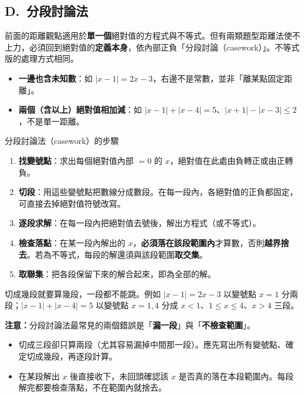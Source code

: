 \documentclass[11pt]{article}
\begin{document}
\subsection*{\sffamily D.\ 分段討論法}

前面的距離觀點適用於\textbf{單一個}絕對值的方程式與不等式。但有兩類題型距離法使不上力，必須回到絕對值的\textbf{定義本身}，依內部正負「分段討論（casework）」。不等式版的處理方式相同。

\begin{itemize}\setlength{\itemsep}{1pt}
\item \textbf{一邊也含未知數}：如 $|x-1|=2x-3$，右邊不是常數，並非「離某點固定距離」。
\item \textbf{兩個（含以上）絕對值相加減}：如 $|x-1|+|x-4|=5$、$|x+1|-|x-3|\le2$，不是單一距離。
\end{itemize}

\begin{補充框}{分段討論法（casework）的步驟}
\begin{enumerate}\setlength{\itemsep}{1pt}
\item \textbf{找變號點}：求出每個絕對值內部 $=0$ 的 $x$，絕對值在此處由負轉正或由正轉負。
\item \textbf{切段}：用這些變號點把數線分成數段。在每一段內，各絕對值的正負都固定，可直接去掉絕對值符號改寫。
\item \textbf{逐段求解}：在每一段內把絕對值去號後，解出方程式（或不等式）。
\item \textbf{檢查落點}：在某一段內解出的 $x$，\textbf{必須落在該段範圍內}才算數，否則\textbf{越界捨去}。若為不等式，每段的解還須與該段範圍\textbf{取交集}。
\item \textbf{取聯集}：把各段保留下來的解合起來，即為全部的解。
\end{enumerate}
切成幾段就要算幾段，一段都不能跳。例如 $|x-1|=2x-3$ 以變號點 $x=1$ 分兩段；$|x-1|+|x-4|=5$ 以變號點 $x=1,4$ 分成 $x<1$、$1\le x\le4$、$x>4$ 三段。
\end{補充框}


\textbf{注意：}分段討論法最常見的兩個錯誤是「\textbf{漏一段}」與「\textbf{不檢查範圍}」。
\begin{itemize}\setlength{\itemsep}{1pt}
\item 切成三段卻只算兩段（尤其容易漏掉中間那一段）。應先寫出所有變號點、確定切成幾段，再逐段計算。
\item 在某段解出 $x$ 後直接收下，未回頭確認該 $x$ 是否真的落在本段範圍內。每段解完都要檢查落點，不在範圍內就捨去。
\end{itemize}
\end{document}
